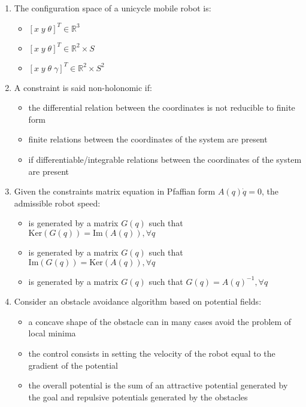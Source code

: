 \documentclass[openany]{book}
\newcommand{\R}{\mathbb{R}}
\theoremstyle{definition}
\theoremstyle{remark}
\begin{document}
\begin{enumerate}
    \item The configuration space of a unicycle mobile robot is:
    \begin{itemize}
        \item[] $[x\; y\; \theta]^T \in \R^3$
        \item[\checkmark] $[x\; y\; \theta]^T \in \R^2 \times S$
        \item[] $[x\; y\; \theta\; \gamma]^T \in \R^2 \times S^2$
    \end{itemize}

    \item A constraint is said non-holonomic if:
    \begin{itemize}
        \item[\checkmark] the differential relation between the coordinates is not reducible to finite form
        \item[] finite relations between the coordinates of the system are present
        \item[] if differentiable/integrable relations between the coordinates of the system are present
    \end{itemize}

    \item Given the constraints matrix equation in Pfaffian form $A(q)\dot{q} = 0$, the admissible robot speed:
    \begin{itemize}
        \item[] is generated by a matrix $G(q)$ such that $\text{Ker}(G(q)) = \text{Im}(A(q)), \forall q$
        \item[\checkmark] is generated by a matrix $G(q)$ such that $\text{Im}(G(q)) = \text{Ker}(A(q)), \forall q$
        \item[] is generated by a matrix $G(q)$ such that $G(q) = A(q)^{-1}, \forall q$
    \end{itemize}

    \item Consider an obstacle avoidance algorithm based on potential fields:
    \begin{itemize}
        \item[] a concave shape of the obstacle can in many cases avoid the problem of local minima
        \item[] the control consists in setting the velocity of the robot equal to the gradient of the potential
        \item[\checkmark] the overall potential is the sum of an attractive potential generated by the goal and repulsive potentials generated by the obstacles
    \end{itemize}


\end{enumerate}
\end{document}
